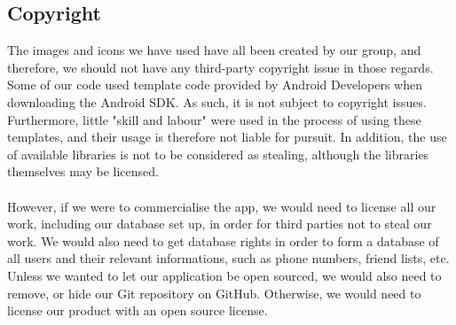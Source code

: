 \documentclass[a4paper,11pt]{article}
\begin{document}
\subsection*{Copyright}
The images and icons we have used have all been created by our group, and therefore, we should not have any third-party copyright issue in those regards.
Some of our code used template code provided by Android Developers when downloading the Android SDK. As such, it is not subject to copyright issues. Furthermore, little "skill and labour" were used in the process of using these templates, and their usage is therefore not liable for pursuit. In addition, the use of available libraries is not to be considered as stealing, although the libraries themselves may be licensed.\\
\\However, if we were to commercialise the app, we would need to license all our work, including our database set up, in order for third parties not to steal our work. We would also need to get database rights in order to form a database of all users and their relevant informations, such as phone numbers, friend lists, etc. \\
Unless we wanted to let our application be open sourced, we would also need to remove, or hide our Git repository on GitHub. Otherwise, we would need to license our product with an open source license.
\end{document}
